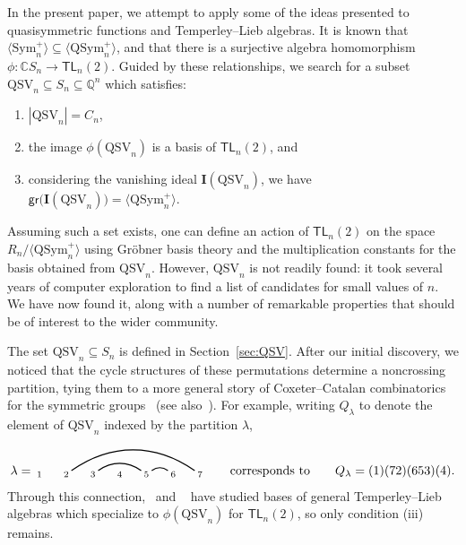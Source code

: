 \documentclass[12pt]{amsart}
\theoremstyle{definition}
\theoremstyle{remark}
\numberwithin{equation}{section}
\newcommand{\CC}{\mathbb{C}}
\newcommand{\QQ}{\mathbb{Q}}
\newcommand{\TL}{\mathsf{TL}}
\newcommand{\Sym}{\mathrm{Sym}}
\newcommand{\QSym}{\mathrm{QSym}}
\newcommand{\QSV}{\mathrm{QSV}}
\begin{document}
In the present paper, we attempt to apply some of the ideas presented to quasisymmetric functions and Temperley--Lieb algebras. 
It is known  that $\langle \Sym_{n}^{+} \rangle \subseteq \langle \QSym_{n}^{+} \rangle$, and that there is a surjective algebra homomorphism $\phi: \CC S_{n} \to \TL_{n}(2)$. 
Guided by these relationships, we search for a subset $\QSV_{n} \subseteq S_{n} \subseteq \QQ^{n}$ which satisfies:
\begin{enumerate}[itemsep = 1ex, label=(\roman*)]
\item $|\QSV_{n}| = C_{n}$,

\item the image $\phi(\QSV_{n})$ is a basis of $\TL_{n}(2)$, and

\item considering the vanishing ideal $\mathbf{I}(\QSV_{n})$, we have $\mathsf{gr}\big(\mathbf{I}(\QSV_{n})\big) = \langle \QSym_{n}^{+} \rangle$.

\end{enumerate}
Assuming such a set exists, one can define an action of $\TL_{n}(2)$ on the space $R_{n}\big/\langle \QSym_{n}^{+} \rangle$ using Gr\"{o}bner basis theory and the multiplication constants for the basis obtained from $\QSV_{n}$.  
However, $\QSV_{n}$ is not readily found: it took several years of computer exploration to find a list of candidates for small values of $n$.  
We have now found it, along with a number of remarkable properties that should be of interest to the wider community.

The set $\QSV_{n} \subseteq S_{n}$ is defined in Section~\ref{sec:QSV}.  
After our initial discovery, we noticed that the cycle structures of these permutations determine a noncrossing partition, tying them to a more general story of Coxeter--Catalan combinatorics for the symmetric groups~\cite{Baine} (see also~\cite{McCammond}).  
For example, writing $Q_{\lambda}$ to denote the element of $\QSV_{n}$ indexed by the partition $\lambda$,
\[
\lambda = \begin{tikzpicture}[scale = 0.75, baseline = 0.75*-0.2]
\foreach \x in {1, ..., 7}{\draw[fill] (\x - 1, 0) node[inner sep = 2pt] (\x) {$\scriptstyle \x$};}
\foreach \i\j in {5/6, 3/5,2/7}{\draw[thick] (\i) to[out = 35, in = 145] (\j);}
\end{tikzpicture}
\qquad\text{corresponds to}\qquad
Q_{\lambda} = (1)(72)(653)(4).
\]
Through this connection,~\cite{GobetWilliams, Gobet} and ~\cite{Zinno} have studied bases of general Temperley--Lieb algebras which specialize to $\phi(\QSV_{n})$ for $\TL_{n}(2)$, so only condition (iii) remains.
\end{document}
